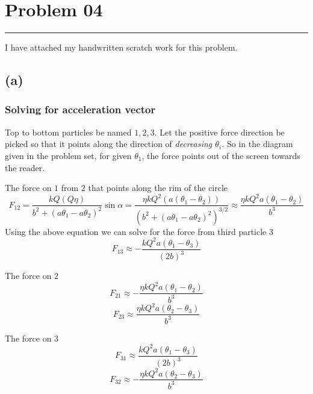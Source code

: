\documentclass[letter, 10pts]{article}
\begin{document}
\newpage
\section*{Problem 04}
\hrule 
I have attached my handwritten scratch work for this problem. 
\subsection*{(a)} 
\subsubsection*{Solving for acceleration vector}
Top to bottom particles be named $1,2,3$. Let the positive force direction be picked so that it points along the direction of \emph{decreasing $\theta_i$.} So in the diagram given in the problem set, for given $\theta_1$, the force points out of the screen towards the reader.

The force on $1$ from $2$ that points along the rim of the circle
\[
F_{12} = \frac{k Q (Q \eta )}{b^2 + (a \theta_1 - a \theta_2 ) ^2 } \sin \alpha =
\frac{\eta k Q^2 \left(a (\theta_1 - \theta_2)\right) }{\left(b^2 + (a \theta_1  - a \theta_2) ^2\right) ^{3 / 2} }
\approx 
\frac{\eta k Q^2 a (\theta_1 - \theta_2) }{b^3}
\]
Using the above equation we can solve for the force from third particle $3$
\[
F_{13} \approx - \frac{k Q^2 a (\theta_1 - \theta_3) }{(2 b)^3}
\]

The force on $2$ 
\[
F_{21} \approx  - \frac{\eta k Q^2 a (\theta_1 - \theta_2) }{b^3}
\] 
\[
F_{23} \approx \frac{\eta k Q^2 a(\theta_2 - \theta_3)}{b^3}
\]

The force on $3$ 
\[
F_{31} \approx \frac{k Q^2 a (\theta_1 - \theta_3) }{(2b)^3}
\] 
\[
F_{32}  \approx  - \frac{\eta k Q^2 a (\theta_2 - \theta_3) }{b^3}
\] 
\end{document}
